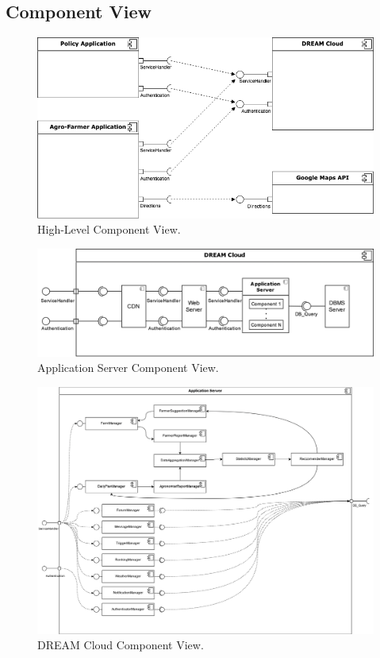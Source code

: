 \clearpage
\subsection{Component View}

\begin{figure}[hbt!]
\centering
\includegraphics[width=\textwidth]{../images_diagrams/dd/high_level_cloud.png}
\caption{High-Level Component View.}
\label{fig:highLevelComp}
\end{figure}

\begin{figure}[hbt!]
\centering
\includegraphics[width=\textwidth]{../images_diagrams/dd/component_only_cloud.png}
\caption{Application Server Component View.}
\label{fig:highLevelComp}
\end{figure}

\clearpage
\begin{figure}[hbt!]
\centering
\includegraphics[width=\textwidth]{../images_diagrams/dd/component_only_application.png}
\caption{DREAM Cloud Component View.}
\label{fig:highLevelComp}
\end{figure}

